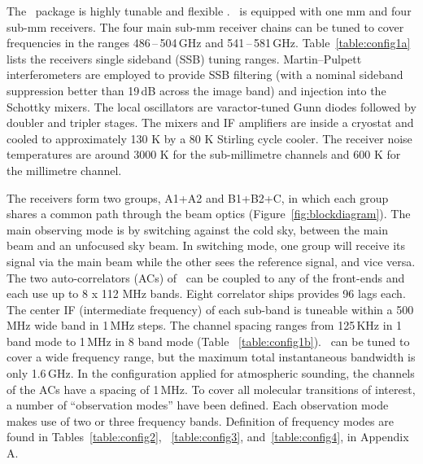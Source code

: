 The \smr\ package is highly tunable and flexible \citep{frisk:theod:03}.
\smr\ is equipped with one mm and four sub-mm receivers.
The four main sub-mm receiver chains can be tuned to cover
frequencies in the ranges 486\,--\,504\,GHz and 541\,--\,581\,GHz.
Table~\ref{table:config1a} lists the receivers single sideband (SSB) tuning ranges.
Martin--Pulpett interferometers are employed to provide SSB filtering 
(with a nominal sideband suppression better than 19\,dB across
the image band) and injection into the Schottky mixers.
The local oscillators are varactor-tuned Gunn diodes followed by
doubler and tripler stages. The mixers and IF amplifiers are inside a cryostat and
cooled to approximately 130 K by a 80 K Stirling cycle cooler. The receiver
noise temperatures are around 3000 K for
the sub-millimetre channels and 600 K for the millimetre channel.

The receivers form two groups, A1+A2 and B1+B2+C, in which each group shares
a common path through the beam optics (Figure~\ref{fig:blockdiagram}). 
The main observing mode is by switching against the cold sky, between the
main beam and an unfocused sky beam. In switching mode, one group will
receive its signal via the main beam while the other sees the reference signal,
and vice versa.
The two auto-correlators (ACs) of \smr\ can be coupled to any of the front-ends
and each use up to 8 x 112 MHz bands.
Eight correlator ships provides 96 lags each.
The center IF (intermediate frequency) of each sub-band is tuneable
within a 500\,MHz wide band in 1\,MHz steps. The channel spacing
ranges from 125\,KHz in 1 band mode to 1\,MHz in 8 band mode (Table ~\ref{table:config1b}).
\smr\ can be tuned to cover a wide frequency range, but the maximum total instantaneous
bandwidth is only 1.6\,GHz. In the configuration applied for
atmospheric sounding, the channels of the ACs have a spacing of 1\,MHz.
To cover all molecular transitions of interest, a 
number of ``observation modes'' have been defined. Each observation mode makes
use of two or three frequency bands. 
Definition of frequency modes are found in Tables~\ref{table:config2}, 
~\ref{table:config3}, and~\ref{table:config4}, in Appendix A.

